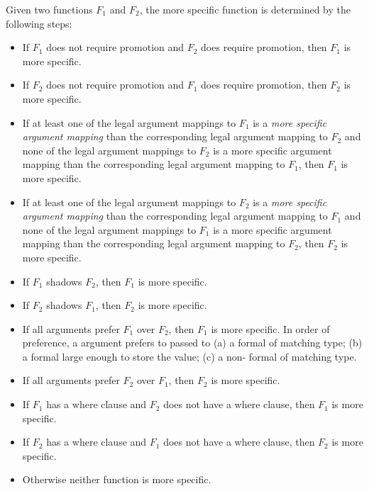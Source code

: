 Given two functions $F_1$ and $F_2$, the more specific function is
determined by the following steps:
\begin{itemize}
\item If $F_1$ does not require promotion and $F_2$ does require promotion, then $F_1$ is more specific.
\item If $F_2$ does not require promotion and $F_1$ does require promotion, then $F_2$ is more specific.
\item
If at least one of the legal argument mappings to $F_1$ is a {\em more
specific argument mapping} than the corresponding legal argument
mapping to $F_2$ and none of the legal argument mappings to $F_2$ is a
more specific argument mapping than the corresponding legal argument
mapping to $F_1$, then $F_1$ is more specific.
\item
If at least one of the legal argument mappings to $F_2$ is a {\em more
specific argument mapping} than the corresponding legal argument
mapping to $F_1$ and none of the legal argument mappings to $F_1$ is a
more specific argument mapping than the corresponding legal argument
mapping to $F_2$, then $F_2$ is more specific.
\item If $F_1$ shadows $F_2$, then $F_1$ is more specific.
\item If $F_2$ shadows $F_1$, then $F_2$ is more specific.
\item If all  arguments prefer $F_1$ over $F_2$, then $F_1$ is more specific.  In order of preference, a  argument prefers to passed to (a) a  formal of matching type; (b) a  formal large enough to store the  value; (c) a non- formal of matching type.
\item If all  arguments prefer $F_2$ over $F_1$, then $F_2$ is more specific.
\item If $F_1$ has a where clause and $F_2$ does not have a where clause, then $F_1$ is more specific.
\item If $F_2$ has a where clause and $F_1$ does not have a where clause, then $F_2$ is more specific.
\item Otherwise neither function is more specific.
\end{itemize}

